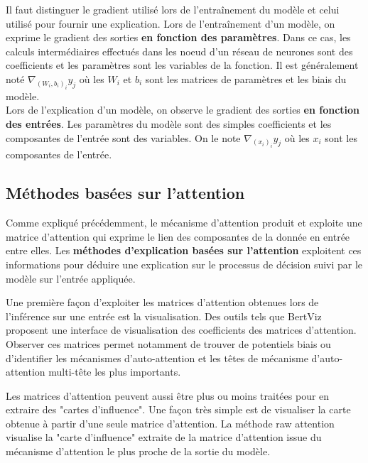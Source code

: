 \documentclass{report}
\begin{document}
        \begin{tcolorbox}[colback=blue!5!white,
                      colframe=blue!75!black,
                      title=Gradient à l'entraînement et lors de l'explication
                     ]
            Il faut distinguer le gradient utilisé lors de l'entraînement du modèle et celui utilisé pour fournir une explication. Lors de l'entraînement d'un modèle, on exprime le gradient des sorties \textbf{en fonction des paramètres}. Dans ce cas, les calculs intermédiaires effectués dans les noeud d'un réseau de neurones sont des coefficients et les paramètres sont les variables de la fonction. Il est généralement noté $\nabla_{(W_i,b_i)_i}y_j$ où les $W_i$ et $b_i$ sont les matrices de paramètres et les biais du modèle.\\
            Lors de l'explication d'un modèle, on observe le gradient des sorties \textbf{en fonction des entrées}. Les paramètres du modèle sont des simples coefficients et les composantes de l'entrée sont des variables. On le note $\nabla_{(x_i)_i}y_j$ où les $x_i$ sont les composantes de l'entrée.
        \end{tcolorbox}

    
    \subsection{Méthodes basées sur l'attention}
        
        Comme expliqué précédemment, le mécanisme d'attention produit et exploite une matrice d'attention qui exprime le lien des composantes de la donnée en entrée entre elles. Les \textbf{méthodes d'explication basées sur l'attention} exploitent ces informations pour déduire une explication sur le processus de décision suivi par le modèle sur l'entrée appliquée.
        
        Une première façon d'exploiter les matrices d'attention obtenues lors de l'inférence sur une entrée est la visualisation. Des outils tels que BertViz \cite{vig_multiscale_2019} proposent une interface de visualisation des coefficients des matrices d'attention. Observer ces matrices permet notamment de trouver de potentiels biais ou d'identifier les mécanismes d'auto-attention et les têtes de mécanisme d'auto-attention multi-tête les plus importants.
        
        Les matrices d'attention peuvent aussi être plus ou moins traitées pour en extraire des "cartes d'influence". Une façon très simple est de visualiser la carte obtenue à partir d'une seule matrice d'attention. La méthode raw attention \cite{chefer_transformer_2021} visualise la "carte d'influence" extraite de la matrice d'attention issue du mécanisme d'attention le plus proche de la sortie du modèle.
        
\end{document}
